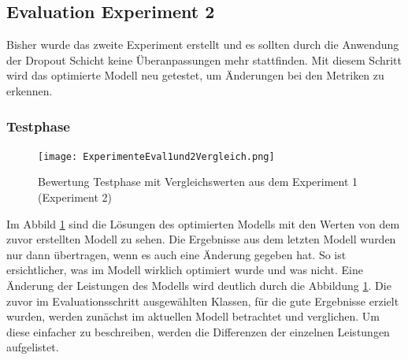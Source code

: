 \documentclass[12pt]{scrreprt}
\begin{document}
\subsection{Evaluation Experiment 2}\label{eval:eval2}

Bisher wurde das zweite Experiment erstellt und es sollten durch die Anwendung der Dropout Schicht keine Überanpassungen mehr stattfinden. Mit diesem Schritt wird das optimierte Modell neu getestet, um Änderungen bei den Metriken zu erkennen.
\subsubsection{Testphase}

\begin{figure}[h!]
	\centering
	\texttt{[image: ExperimenteEval1und2Vergleich.png]}
	\caption{ Bewertung Testphase mit Vergleichswerten aus dem Experiment 1 \cite{HK22}(Experiment 2)}
	\label{fig:fig30}
\end{figure}

Im Abbild \ref{fig:fig30} sind die Lösungen des optimierten Modells mit den Werten von dem zuvor erstellten Modell zu sehen. Die Ergebnisse aus dem letzten Modell wurden nur dann übertragen, wenn es auch eine Änderung gegeben hat. So ist ersichtlicher, was im Modell wirklich optimiert wurde und was nicht. Eine Änderung der Leistungen des Modells wird deutlich durch die Abbildung \ref{fig:fig30}. Die zuvor im Evaluationsschritt ausgewählten Klassen, für die gute Ergebnisse erzielt wurden, werden zunächst im aktuellen Modell betrachtet und verglichen. Um diese einfacher zu beschreiben, werden die Differenzen der einzelnen Leistungen aufgelistet.\\
\end{document}
